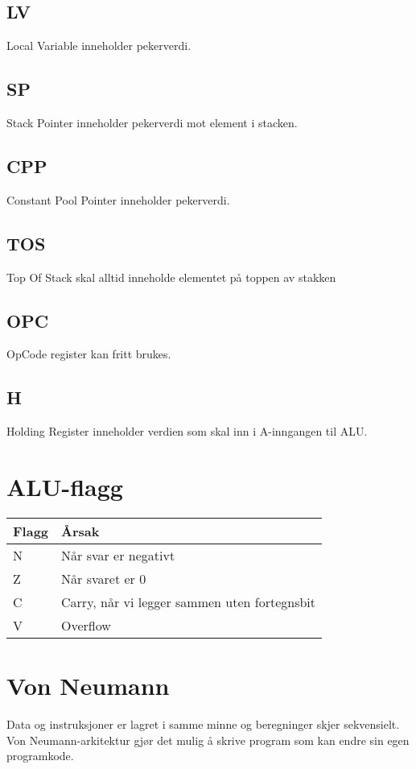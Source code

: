 \documentclass[a4paper, 10pt]{article}
\begin{document}
\subsection{LV}
Local Variable inneholder pekerverdi.

\subsection{SP}
Stack Pointer inneholder pekerverdi mot element i stacken.

\subsection{CPP}
Constant Pool Pointer inneholder pekerverdi.

\subsection{TOS}
Top Of Stack skal alltid inneholde elementet på toppen av stakken

\subsection{OPC}
OpCode register kan fritt brukes.

\subsection{H}
Holding Register inneholder verdien som skal inn i A-inngangen til ALU.

\section{ALU-flagg}
\begin{tabular}{|l|l|}
    \hline
    Flagg & Årsak                                        \\ \hline
    N     & Når svar er negativt                         \\ \hline
    Z     & Når svaret er 0                              \\ \hline
    C     & Carry, når vi legger sammen uten fortegnsbit \\ \hline
    V     & Overflow                                     \\ \hline
\end{tabular}

\section{Von Neumann}
Data og instruksjoner er lagret i samme minne og beregninger skjer sekvensielt. Von Neumann-arkitektur gjør det mulig å skrive program som kan endre sin egen programkode.
\end{document}
